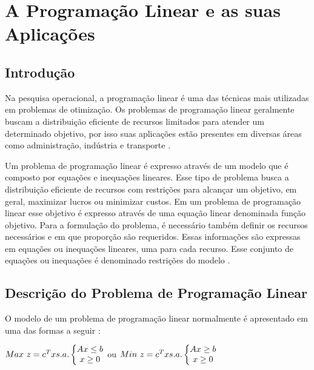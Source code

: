 \chapter{A Programação Linear e as suas Aplicações}

\section{Introdução}
Na pesquisa operacional, a programação linear é uma das técnicas mais utilizadas em problemas de otimização. Os problemas de programação linear geralmente buscam a distribuição eficiente de recursos limitados para atender um determinado objetivo, por isso suas aplicações estão presentes em diversas áreas como administração, indústria e transporte \cite{Engecom}.

Um problema de programação linear é expresso através de um modelo que é composto por equações e inequações lineares. Esse tipo de problema busca a distribuição eficiente de recursos com restrições para alcançar um objetivo, em geral, maximizar lucros ou minimizar custos. Em um problema de programação linear esse objetivo é expresso através de uma equação linear denominada função objetivo. Para a formulação do problema, é necessário também definir os recursos necessários e em que proporção são requeridos. Essas informações são expressas em equações ou inequações lineares, uma para cada recurso. Esse conjunto de equações ou inequações é denominado restrições do modelo \cite{Engecom}.

\section{Descrição do Problema de Programação Linear}
O modelo de um problema de programação linear normalmente é apresentado em uma das formas a seguir \cite{Passos}:

$\\Max\ z = c^{T}x \\s.a.\left\{\begin{matrix}
Ax\leq b\\x\geq 0 
\end{matrix}\right.$
  ou  $\\Min\ z = c^{T}x \\\\s.a.\left\{\begin{matrix}
Ax\geq  b\\x\geq 0 
\end{matrix}\right.$







